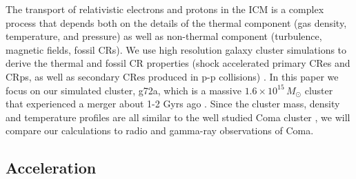 \documentclass[useAMS,usenatbib]{mn2e}
\begin{document}
The transport of relativistic electrons and protons in
the ICM is a complex process that depends both on the details of the
thermal component (gas density, temperature, and pressure) as well as
non-thermal component (turbulence, magnetic fields, fossil CRs). We
use high resolution galaxy cluster simulations to derive the thermal
and fossil CR properties (shock accelerated primary CRes and CRps, as
well as secondary CRes produced in p-p collisions)
\citep{2007MNRAS.378..385P,pfrommer08,pinzke10,pinzke13}. In this
paper we focus on our simulated cluster, g72a, which is a massive
$1.6\times10^{15}\,M_\odot$ cluster that experienced a merger about
1-2 Gyrs ago \citep{2009MNRAS.399..497D}. Since the cluster mass,
density and temperature profiles are all similar to the well studied
Coma cluster \citep{2007MNRAS.378..385P,pinzke10}, we will compare our
calculations to radio and gamma-ray observations of Coma.

\subsection{Acceleration}
\end{document}
